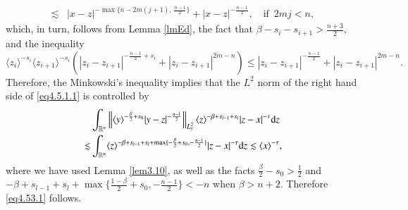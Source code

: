 \documentclass[11pt,reqno]{amsart}
\def\R {\mathbb{R}}
\def\d{{\rm d}}
\numberwithin{equation}{section}
\theoremstyle{definition}
\begin{document}
\begin{appendix}
\begin{equation*}
\begin{aligned}
			\lesssim &|x-z|^{-\max\{n-2m(j+1),\, \frac{n-1}{2}\}}+|x-z|^{-\frac{n-1}{2}}, \quad \mbox{if}\,\,\, 2mj<n,
		\end{aligned}
	\end{equation*}
	which, in turn, follows from Lemma \ref{lmEd}, the fact that  $\beta- s_i-s_{i+1}> \frac{n+3}{2}$, and the inequality
	$$ \langle z_i\rangle^{-s_i} \langle z_{i+1}\rangle^{-s_{i}}\left(|z_{i}-z_{i+1}|^{-\frac{n-1}{2}+s_i}+|z_{i}-z_{i+1}|^{2m-n}\right)\leq |z_i-z_{i+1}|^{-\frac{n-1}{2}}+|z_i-z_{i+1}|^{2m-n}.$$
	Therefore, the Minkowski's inequality implies that the $L^2$ norm of the right hand side of \eqref{eq4.5.1.1} is controlled by 
	\begin{equation*}
		\begin{aligned}
			&\int_{\R^{n}}\left\|\langle y\rangle^{-\frac{\beta}{2}+s_0}|y-z|^{-\frac{n-1}{2}} \right\|_{L^2_y} \langle z\rangle^{-\beta+s_{l-1}+s_l}|z-x|^{-\tau} \d z\\
			\lesssim&\int_{\R^{n}}\langle z\rangle^{-\beta+s_{l-1}+s_l+\max\{-\frac{\beta}{2}+s_0, -\frac{n-1}{2}\}}|z-x|^{-\tau} \d z\lesssim \langle x\rangle^{-\tau},
		\end{aligned}
	\end{equation*}
	where we have used Lemma \ref{lem3.10}, as well as the facts $\frac{\beta}{2}-s_0>\frac12$ and $-\beta+s_{l-1}+s_l+\max\{\frac{1-\beta}{2}+s_0, -\frac{n-1}{2}\}<-n$ when $\beta>n+2$.
	Therefore \eqref{eq4.53.1} follows.
	

\end{appendix}
\end{document}
